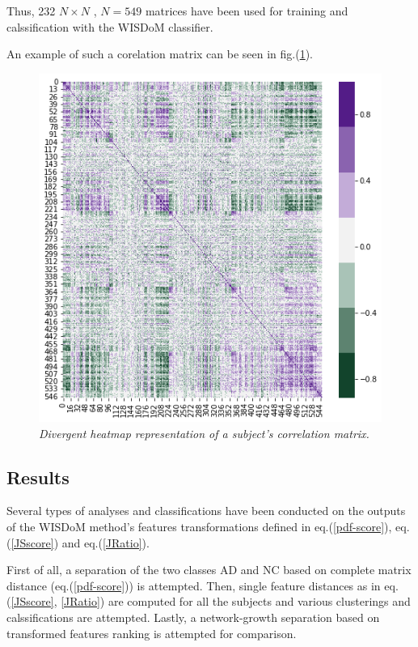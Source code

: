 \documentclass[12pt,openright,twoside,a4paper]{book}
\begin{document}
Thus, 232 $N\times N$ , $N=549$ matrices have been used for training and calssification with the WISDoM classifier.

An example of such a corelation matrix can be seen in fig.(\ref{sample-heat}).

\begin{figure}[!h]
\centering
\includegraphics[scale=0.5]{sample-heat}
\caption{\textit{Divergent heatmap representation of a subject's correlation matrix.}}
\label{sample-heat}
\end{figure}

\subsection{Results}

Several types of analyses and classifications have been conducted on the outputs of the WISDoM method's  features transformations defined in eq.(\ref{pdf-score}), eq.(\ref{JSscore}) and eq.(\ref{JRatio}).

First of all, a separation of the two classes AD and NC based on complete matrix distance (eq.(\ref{pdf-score})) is attempted.
Then, single feature distances as in eq.(\ref{JSscore}, \ref{JRatio}) are computed for all the subjects and various clusterings and calssifications are attempted.
Lastly, a network-growth separation based on transformed features ranking is attempted for comparison.
\end{document}
